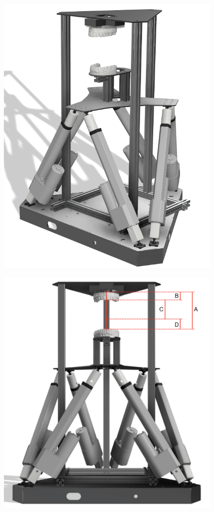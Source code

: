 \begin{figure}[H]
\centering
\begin{minipage}{.4\textwidth}
  \centering
  \includegraphics[width=\linewidth]{figures/overview.png}
  \subcaption{}
  \label{fig:overview}
\end{minipage}
\begin{minipage}{.4\textwidth}
  \centering
  \includegraphics[width=\linewidth]{figures/workspace_2.drawio.png}

\end{minipage}
\end{figure}
